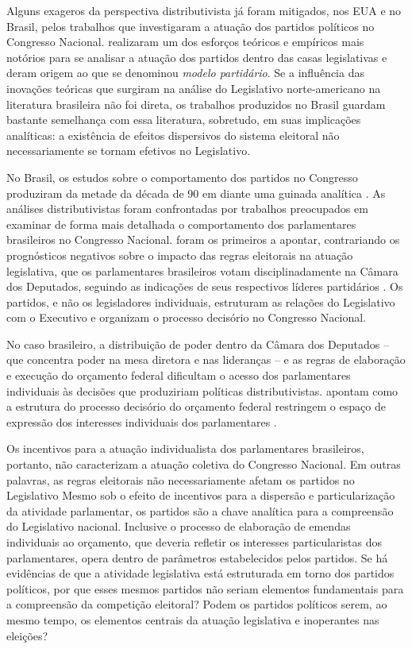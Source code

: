 Alguns exageros da perspectiva distributivista já foram mitigados, nos EUA e no Brasil, pelos trabalhos que investigaram a atuação dos partidos políticos no Congresso Nacional. \citet{Cox1993} realizaram um dos esforços teóricos e empíricos mais notórios para se analisar a atuação dos partidos dentro das casas legislativas e deram origem ao que se denominou \emph{modelo partidário}. Se a influência das inovações teóricas que surgiram na análise do Legislativo norte-americano na literatura brasileira não foi direta, os trabalhos produzidos no Brasil guardam bastante semelhança com essa literatura, sobretudo, em suas implicações analíticas: a existência de efeitos dispersivos do sistema eleitoral não necessariamente se tornam efetivos no Legislativo.

No Brasil, os estudos sobre o comportamento dos partidos no Congresso produziram da metade da década de 90 em diante uma guinada analítica \citep{AmorimNeto2001, AmorimNeto2003, Figueiredo1999a, Figueiredo2000, Figueiredo2002, Figueiredo2008, Limongi2005, Santos1997, Santos1999, Santos2002}. As análises distributivistas foram confrontadas por trabalhos preocupados em examinar de forma mais detalhada o comportamento dos parlamentares brasileiros no Congresso Nacional. \citeauthor{Figueiredo1999a} foram os primeiros a apontar, contrariando os prognósticos negativos sobre o impacto das regras eleitorais na atuação legislativa, que os parlamentares brasileiros votam disciplinadamente na Câmara dos Deputados, seguindo as indicações de seus respectivos líderes partidários \citep{Figueiredo1999a}. Os partidos, e não os legisladores individuais, estruturam as relações do Legislativo com o Executivo e  organizam o processo decisório no Congresso Nacional.

No caso brasileiro, a distribuição de poder dentro da Câmara dos Deputados -- que concentra poder na mesa diretora e nas lideranças -- e as regras de elaboração e execução do orçamento federal dificultam o acesso dos parlamentares individuais às decisões que produziriam políticas distributivistas. \citeauthor{Figueiredo1999a} apontam como a estrutura do processo decisório do orçamento federal restringem o espaço de expressão dos interesses individuais dos parlamentares \citep{Figueiredo1999a,Figueiredo2008}.

Os incentivos para a atuação individualista dos parlamentares brasileiros, portanto, não caracterizam a atuação coletiva do Congresso Nacional. Em outras palavras, as regras eleitorais não necessariamente afetam os partidos no Legislativo \citep{Desposato2008} Mesmo sob o efeito de incentivos para a dispersão e particularização da atividade parlamentar, os partidos são a chave analítica para a compreensão do Legislativo nacional. Inclusive o processo de elaboração de emendas individuais ao orçamento, que deveria refletir os interesses particularistas dos parlamentares, opera dentro de parâmetros estabelecidos pelos partidos. Se há evidências de que a atividade legislativa está estruturada em torno dos partidos políticos, por que esses mesmos partidos não seriam elementos fundamentais para a compreensão da competição eleitoral? Podem os partidos políticos serem, ao mesmo tempo, os elementos centrais da atuação legislativa e inoperantes nas eleições?

